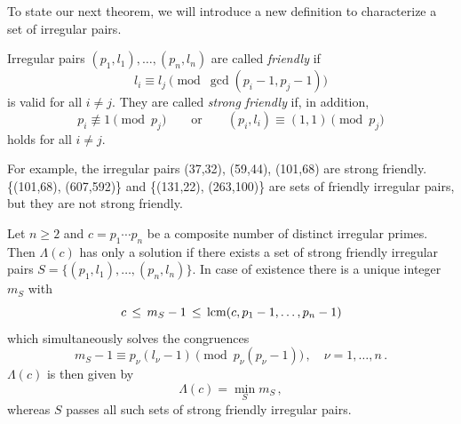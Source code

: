 \documentclass[12pt,english]{article}
\begin{document}
To state our next theorem, we will introduce a new definition to characterize
a set of irregular pairs.


\begin{defin}
Irregular pairs $(p_1,l_1), \ldots, (p_n,l_n)$ are called \textsl{friendly} if
\[
    l_i \equiv l_j \pmod{\gcd(p_i-1,p_j-1)}
\]
is valid for all $i \neq j$. They are called \textsl{strong friendly} if, in addition,
\[
    p_i \not\equiv 1 \pmod{p_j} \qquad \mbox{or} \qquad
      (p_i,l_i) \equiv (1,1) \pmod{p_j}
\]
holds for all $i \neq j$.
\end{defin}
\medskip

For example, the irregular pairs (37,32), (59,44), (101,68) are strong friendly.
 \{(101,68), (607,592)\} and \{(131,22), (263,100)\} are sets of
friendly irregular pairs, but they are not strong friendly.

\begin{theorem} \label{theor-LamdaC}
Let $n \geq 2$ and $c=p_1 \cdots p_n$ be a composite number of
distinct irregular primes. Then $\Lambda(c)$ has only a solution if
there exists a set of strong friendly irregular pairs
$S=\{ (p_1,l_1), \ldots, (p_n,l_n) \}$. In case of existence there is
a unique integer $m_S$ with
\[
    c \, \le \, m_S-1 \, \le \, \mathop{\rm lcm}\nolimits(c,p_1-1,\ldots,p_n-1)
\]
which simultaneously solves the congruences
\[
    m_S-1 \equiv p_\nu(l_\nu-1) \pmod{p_\nu(p_\nu-1)}\,,
      \quad \nu=1,\ldots,n \,.
\]
$\Lambda(c)$ is then given by
\[
    \Lambda(c) = \min_S m_S \,,
\]
whereas $S$ passes all such sets of strong friendly irregular pairs.
\end{theorem}
\end{document}
